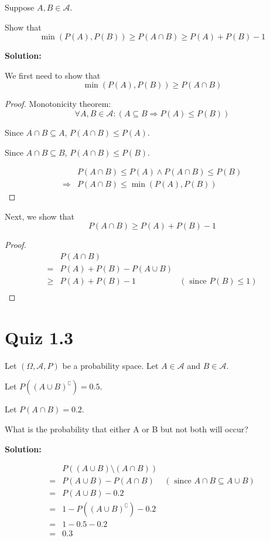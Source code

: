 \documentclass{article}
\begin{document}
Suppose \(A,B \in \mathcal{A}\).

Show that
\[\min(P(A),P(B)) \geq P(A\cap B) \geq P(A)+P(B)-1\]

\textbf{Solution:}

We first need to show that
\[\min(P(A), P(B)) \geq P(A \cap B)\]

\begin{proof}
Monotonicity theorem:
\[\forall A,B\in \mathcal{A}: (A\subseteq B \Rightarrow P(A)\leq P(B))\]

Since \(A\cap B \subseteq A\), \(P(A\cap B) \leq P(A)\).

Since \(A\cap B \subseteq B\), \(P(A\cap B) \leq P(B)\).

\begin{align*}
	 & P(A\cap B)\leq P(A) \wedge P(A\cap B)\leq P(B) \\
	\Rightarrow & P(A \cap B) \leq \min(P(A), P(B))
\end{align*}
\end{proof}

Next, we show that
\[P(A \cap B) \geq P(A)+P(B)-1\]

\begin{proof}
\begin{align*}
	 & P(A \cap B) \\
	=& P(A)+P(B)-P(A \cup B) \\
	\geq& P(A)+P(B)-1 & (\text{ since } P(B)\leq 1) \\
\end{align*}
\end{proof}

\section{Quiz 1.3}

Let \((\Omega, \mathcal{A}, P)\) be a probability space.
Let \(A\in \mathcal{A}\) and \(B\in \mathcal{A}\).

Let \(P((A\cup B)^\complement)=0.5\).

Let \(P(A\cap B)=0.2\).

What is the probability that either A or B but not both will occur?

\textbf{Solution:}

\begin{align*}
	 & P((A\cup B)\setminus(A\cap B)) \\
	=& P(A\cup B)-P(A\cap B) & (\text{ since }A\cap B \subseteq A\cup B) \\
	=& P(A\cup B)-0.2 \\
	=& 1-P((A \cup B)^\complement)-0.2 \\
	=& 1-0.5-0.2 \\
	=& 0.3 \\
\end{align*}
\end{document}
